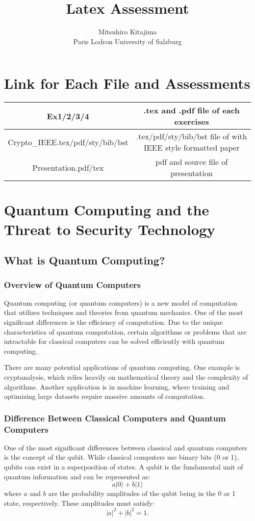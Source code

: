 \documentclass[10pt]{article}
\title{Latex Assessment}
\author{Mitsuhiro Kitajima \\Paris Lodron University of Salzburg}
\begin{document}
    \maketitle

    \section{Link for Each File and Assessments}
    \begin{tabular}{|c|c|}
        \hline
        Ex1/2/3/4 & .tex and .pdf file of each exercises \\
        \hline
        Crypto\_IEEE.tex/pdf/sty/bib/bst & .tex/pdf/sty/bib/bst file of with IEEE style formatted paper \\
        \hline
        Presentation.pdf/tex & pdf and source file of presentation \\
        \hline
    \end{tabular}

    \section{Quantum Computing and the Threat to Security Technology}

    \subsection{What is Quantum Computing?}

    \subsubsection{Overview of Quantum Computers}
    Quantum computing (or quantum computers) is a new model of computation that utilizes techniques and theories from quantum mechanics. One of the most significant differences is the efficiency of computation. Due to the unique characteristics of quantum computation, certain algorithms or problems that are intractable for classical computers can be solved efficiently with quantum computing.

    There are many potential applications of quantum computing. One example is cryptanalysis, which relies heavily on mathematical theory and the complexity of algorithms. Another application is in machine learning, where training and optimizing large datasets require massive amounts of computation.

    \subsubsection{Difference Between Classical Computers and Quantum Computers}
    One of the most significant differences between classical and quantum computers is the concept of the qubit. While classical computers use binary bits (0 or 1), qubits can exist in a superposition of states. A qubit is the fundamental unit of quantum information and can be represented as:
    \[
        a|0\rangle + b|1\rangle
    \]
    where \(a\) and \(b\) are the probability amplitudes of the qubit being in the 0 or 1 state, respectively. These amplitudes must satisfy:
    \[
        |a|^2 + |b|^2 = 1.
    \]
\end{document}
